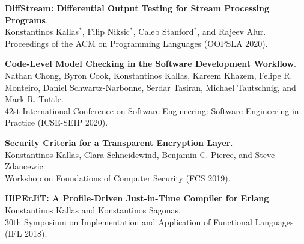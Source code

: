 \begin{minipage}{\textwidth}
\textbf{DiffStream: Differential Output Testing for Stream Processing Programs}. \\
Konstantinos Kallas$^*$, Filip Niksic$^*$, Caleb Stanford$^*$, and Rajeev Alur. \\
Proceedings of the ACM on Programming Languages (OOPSLA 2020).
\end{minipage}

\begin{minipage}{\textwidth}
\textbf{Code-Level Model Checking in the Software Development Workflow}. \\
Nathan Chong, Byron Cook, Konstantinos Kallas, Kareem Khazem, Felipe R. Monteiro, Daniel Schwartz-Narbonne, Serdar Tasiran, Michael Tautschnig, and Mark R. Tuttle. \\
42st International Conference on Software Engineering: Software Engineering in Practice (ICSE-SEIP 2020).
\end{minipage}

\begin{minipage}{\textwidth}
\textbf{Security Criteria for a Transparent Encryption Layer}. \\
Konstantinos Kallas, Clara Schneidewind, Benjamin C. Pierce, and Steve Zdancewic. \\
Workshop on Foundations of Computer Security (FCS 2019).
\end{minipage}

\begin{minipage}{\textwidth}
\textbf{HiPErJiT: A Profile-Driven Just-in-Time Compiler for Erlang}. \\
Konstantinos Kallas and Konstantinos Sagonas. \\
30th Symposium on Implementation and Application of Functional Languages (IFL 2018).
\end{minipage}


